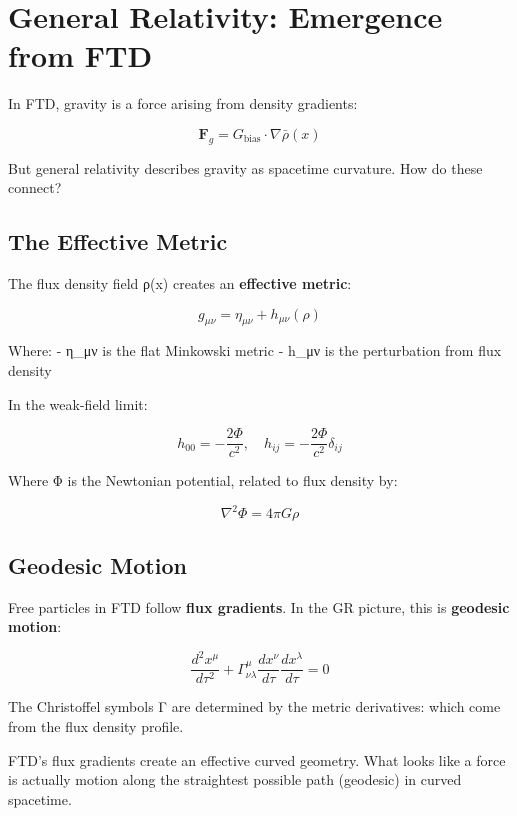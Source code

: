 \documentclass[
  11pt,
  letterpaper,
  twoside,
  openright]{book}
\begin{document}
\section{General Relativity: Emergence from
FTD}\label{general-relativity-emergence-from-ftd}

In FTD, gravity is a force arising from density gradients:

\[\mathbf{F}_g = G_{\text{bias}} \cdot \nabla\bar{\rho}(x)\]

But general relativity describes gravity as spacetime curvature. How do
these connect?

\subsection{The Effective Metric}\label{the-effective-metric}

The flux density field ρ(x) creates an \textbf{effective metric}:

\[g_{\mu\nu} = \eta_{\mu\nu} + h_{\mu\nu}(\rho)\]

Where: - η\_μν is the flat Minkowski metric - h\_μν is the perturbation
from flux density

In the weak-field limit:

\[h_{00} = -\frac{2\Phi}{c^2}, \quad h_{ij} = -\frac{2\Phi}{c^2}\delta_{ij}\]

Where Φ is the Newtonian potential, related to flux density by:

\[\nabla^2\Phi = 4\pi G \rho\]

\subsection{Geodesic Motion}\label{geodesic-motion}

Free particles in FTD follow \textbf{flux gradients}. In the GR picture,
this is \textbf{geodesic motion}:

\[\frac{d^2x^\mu}{d\tau^2} + \Gamma^\mu_{\nu\lambda}\frac{dx^\nu}{d\tau}\frac{dx^\lambda}{d\tau} = 0\]

The Christoffel symbols Γ are determined by the metric derivatives:
which come from the flux density profile.

\begin{tcolorbox}[enhanced jigsaw, leftrule=.75mm, title=\textcolor{quarto-callout-note-color}{\faInfo}\hspace{0.5em}{Gravity as Geometry}, bottomrule=.15mm, opacityback=0, coltitle=black, arc=.35mm, colframe=quarto-callout-note-color-frame, colbacktitle=quarto-callout-note-color!10!white, colback=white, titlerule=0mm, breakable, bottomtitle=1mm, toptitle=1mm, rightrule=.15mm, toprule=.15mm, left=2mm, opacitybacktitle=0.6]

FTD's flux gradients create an effective curved geometry. What looks
like a force is actually motion along the straightest possible path
(geodesic) in curved spacetime.

\end{tcolorbox}
\end{document}
